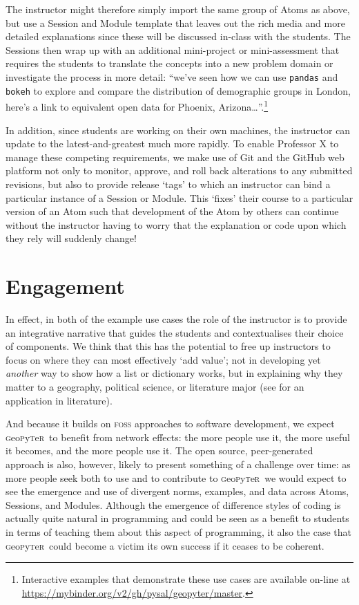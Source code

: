 \documentclass[letter, 11pt,titlepage]{article}
\newcommand{\gp}{\textsc{g}eo\textsc{p}y\textsc{t}e\textsc{r}~\/}
\begin{document}
The instructor might therefore simply import the same group of Atoms as above,
but use a Session and Module template that leaves out the rich media and more
detailed explanations since these will be discussed in-class with the students.
The Sessions then wrap up with an additional mini-project or mini-assessment
that requires the students to translate the concepts into a new problem domain
or investigate the process in more detail: ``we've seen how we can use
\texttt{pandas} and \texttt{bokeh} to explore and compare the distribution of
demographic groups in London, here's a link to equivalent open data for Phoenix,
Arizona\ldots{}''.\footnote{Interactive examples that demonstrate these use
  cases are available on-line at \url{https://mybinder.org/v2/gh/pysal/geopyter/master}.}

In addition, since students are working on their own machines, the instructor can update to the latest-and-greatest much more rapidly. To enable Professor X to manage these competing requirements, we make use of Git and the GitHub web platform not only to monitor, approve, and roll back alterations to any submitted revisions, but also to provide release `tags' to which an instructor can bind a particular instance of a Session or Module. This `fixes' their course to a particular version of an Atom such that development of the Atom by others can continue without the instructor having to worry that the explanation or code upon which they rely will suddenly change! 

\section{Engagement}\label{sec:engagement}

In effect, in both of the example use cases the role of the instructor is to provide an integrative narrative that guides the students and contextualises their choice of components. We think that this has the potential to free up instructors to focus on where they can most effectively `add value'; not in developing yet \emph{another} way to show how a list or dictionary works, but in explaining why they matter to a geography, political science, or literature major (see \citealp{Bort2015} for an application in literature).

And because it builds on \textsc{foss} approaches to software development, we expect \gp to benefit from network effects: the more people use it, the more useful it becomes, and the more people use it. The open source, peer-generated approach is also, however, likely to present something of a challenge over time: as more people seek both to use and to contribute to \gp we would expect to see the emergence and use of divergent norms, examples, and data across Atoms, Sessions, and Modules. Although the emergence of difference styles of coding is actually quite natural in programming and could be seen as a benefit to students in terms of teaching them about this aspect of programming, it also the case that \gp could become a victim its own success if it ceases to be coherent.
\end{document}
